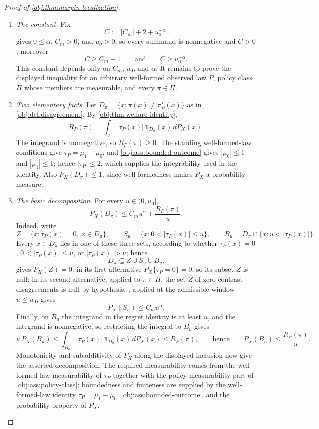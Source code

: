 \begin{proof}[Proof of \cref{obj:thm:margin-localization}]
\begin{enumerate}
\item \emph{The constant.}  Fix
\[
C:=|C_m|+2+u_0^{-\alpha}.
\]
 gives \(0\le\alpha\), \(C_m>0\), and \(u_0>0\), so every summand is nonnegative and \(C>0\); moreover
\[
C\ge C_m+1
\qquad\text{and}\qquad
C\ge u_0^{-\alpha}.
\]
This constant depends only on \(C_m\), \(u_0\), and \(\alpha\).  It remains to prove the displayed inequality for an arbitrary well-formed observed law \(P\), policy class \(\Pi\) whose members are measurable, and every \(\pi\in\Pi\). %

\item \emph{Two elementary facts.}  Let \(D_\pi=\{x:\pi(x)\ne\pi^\star_P(x)\}\) as in \cref{obj:def:disagreement}.  By \cref{obj:thm:welfare-identity},
\[
R_P(\pi)=\int_{\mathcal X} |\tau_P(x)|\,\mathbf 1_{D_\pi}(x)\,dP_X(x).
\]
The integrand is nonnegative, so \(R_P(\pi)\ge0\).  The standing well-formed-law conditions give \(\tau_P=\mu_1-\mu_0\), and \cref{obj:ass:bounded-outcome} gives \(|\mu_0|\le1\) and \(|\mu_1|\le1\); hence \(|\tau_P|\le2\), which supplies the integrability used in the identity.  Also \(P_X(D_\pi)\le1\), since well-formedness makes \(P_X\) a probability measure. %

\item \emph{The basic decomposition.}  For every \(u\in(0,u_0]\),
\[
P_X(D_\pi)\le C_m u^\alpha+\frac{R_P(\pi)}{u}.
\]
Indeed, write
\[
Z=\{x:\tau_P(x)=0,\ x\in D_\pi\},\qquad
S_u=\{x:0<|\tau_P(x)|\le u\},\qquad
B_u=D_\pi\cap\{x:u<|\tau_P(x)|\}.
\]
Every \(x\in D_\pi\) lies in one of these three sets, according to whether \(\tau_P(x)=0\), \(0<|\tau_P(x)|\le u\), or \(|\tau_P(x)|>u\); hence
\[
D_\pi\subseteq Z\cup S_u\cup B_u .
\]
 gives \(P_X(Z)=0\): in its first alternative \(P_X\{\tau_P=0\}=0\), so its subset \(Z\) is null; in its second alternative, applied to \(\pi\in\Pi\), the set \(Z\) of zero-contrast disagreements is null by hypothesis.  , applied at the admissible window \(u\le u_0\), gives
\[
P_X(S_u)\le C_m u^\alpha .
\]
Finally, on \(B_u\) the integrand in the regret identity is at least \(u\), and the integrand is nonnegative, so restricting the integral to \(B_u\) gives
\[
u\,P_X(B_u)\le \int_{B_u}|\tau_P(x)|\,\mathbf 1_{D_\pi}(x)\,dP_X(x)\le R_P(\pi),
\qquad\text{hence}\qquad
P_X(B_u)\le \frac{R_P(\pi)}u .
\]
Monotonicity and subadditivity of \(P_X\) along the displayed inclusion now give the asserted decomposition.  The required measurability comes from the well-formed-law measurability of \(\tau_P\) together with the policy-measurability part of \cref{obj:ass:policy-class}; boundedness and finiteness are supplied by the well-formed-law identity \(\tau_P=\mu_1-\mu_0\), \cref{obj:ass:bounded-outcome}, and the probability property of \(P_X\). %


\end{enumerate}
\end{proof}
